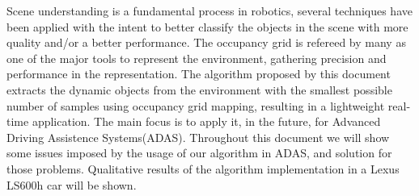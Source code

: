 Scene understanding is a fundamental process in robotics, several techniques have been applied with the intent to better classify the objects in the scene with more quality and/or a better performance. The occupancy grid is refereed by many as one of the major tools to represent the environment, gathering precision and performance in the representation. The algorithm proposed by this document extracts the dynamic objects from the environment with the smallest possible number of samples using occupancy grid mapping, resulting in a lightweight real-time application. The main focus is to apply it, in the future, for  Advanced Driving Assistence Systems(ADAS). Throughout this document we will show some issues imposed by the usage of our algorithm in ADAS, and solution for those problems. Qualitative results of the algorithm implementation in a Lexus LS600h car will be shown.


